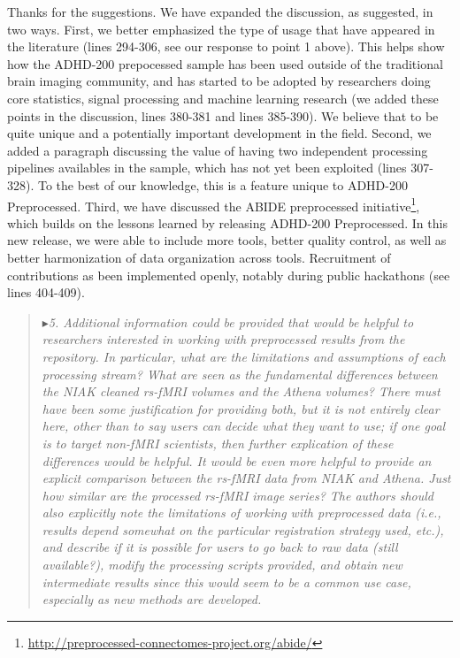 \documentclass[authoryear,3p]{elsarticle}
\begin{document}
Thanks for the suggestions. We have expanded the discussion, as suggested, in two ways. First, we better emphasized the type of usage that have appeared in the literature (lines 294-306, see our response to point 1 above). This helps show how the ADHD-200 prepocessed sample has been used outside of the traditional brain imaging community, and has started to be adopted by researchers doing core statistics, signal processing and machine learning research (we added these points in the discussion, lines 380-381 and lines 385-390). We believe that to be quite unique and a potentially important development in the field. Second, we added a paragraph discussing the value of having two independent processing pipelines availables in the sample, which has not yet been exploited (lines 307-328). To the best of our knowledge, this is a feature unique to ADHD-200 Preprocessed. Third, we have discussed the ABIDE preprocessed initiative\footnote{\url{http://preprocessed-connectomes-project.org/abide/}}, which builds on the lessons learned by releasing ADHD-200 Preprocessed. In this new release, we were able to include more tools, better quality control, as well as better harmonization of data organization across tools. Recruitment of contributions as been implemented openly, notably during public hackathons (see lines 404-409). 

\begin{quote}
$\blacktriangleright$\emph{5. Additional information could be provided that would be helpful to researchers interested in working with preprocessed results from the repository. In particular, what are the limitations and assumptions of each processing stream?  What are seen as the fundamental differences between the NIAK cleaned rs-fMRI volumes and the Athena volumes? There must have been some justification for providing both, but it is not entirely clear here, other than to say users can decide what they want to use; if one goal is to target non-fMRI scientists, then further explication of these differences would be helpful. It would be even more helpful to provide an explicit comparison between the rs-fMRI data from NIAK and Athena.  Just how similar are the processed rs-fMRI image series?  The authors should also explicitly note the limitations of working with preprocessed data (i.e., results depend somewhat on the particular registration strategy used, etc.), and describe if it is possible for users
to go back to raw data (still available?), modify the processing scripts provided, and obtain new intermediate results since this would seem to be a common use case, especially as new methods are developed.
}
\end{quote}
\end{document}
